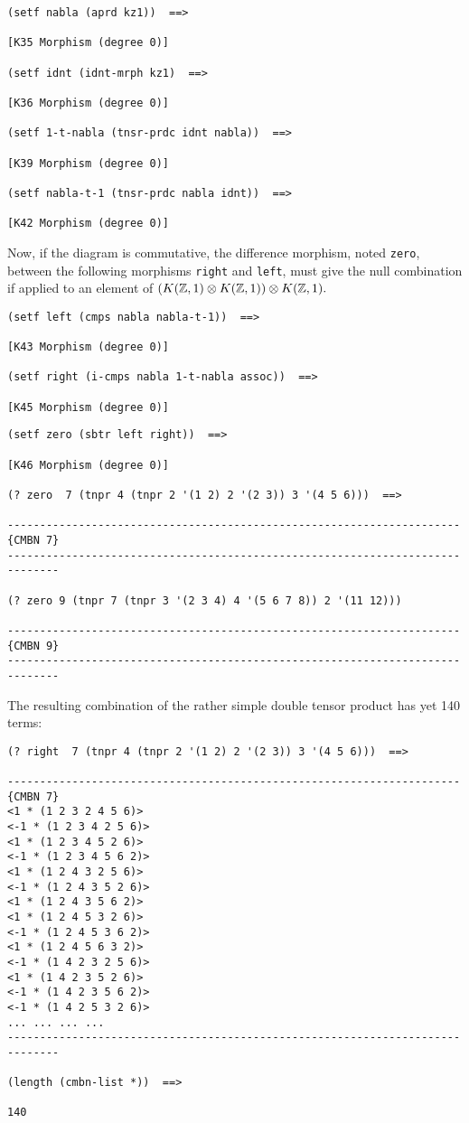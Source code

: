{\footnotesize\begin{verbatim}
(setf nabla (aprd kz1))  ==>

[K35 Morphism (degree 0)]

(setf idnt (idnt-mrph kz1)  ==>

[K36 Morphism (degree 0)]

(setf 1-t-nabla (tnsr-prdc idnt nabla))  ==>

[K39 Morphism (degree 0)]

(setf nabla-t-1 (tnsr-prdc nabla idnt))  ==>

[K42 Morphism (degree 0)]
\end{verbatim}}
Now, if the diagram is commutative, the difference morphism, noted {\tt zero}, between 
the following morphisms {\tt right} and {\tt left}, must give the null combination if applied to an 
element of $(K({{\Bbb Z}}, 1) \otimes K({{\Bbb Z}}, 1)) \otimes K({{\Bbb Z}}, 1).$
{\footnotesize\begin{verbatim}
(setf left (cmps nabla nabla-t-1))  ==>

[K43 Morphism (degree 0)]

(setf right (i-cmps nabla 1-t-nabla assoc))  ==>

[K45 Morphism (degree 0)]
\end{verbatim}}
\newpage
{\footnotesize\begin{verbatim}
(setf zero (sbtr left right))  ==>

[K46 Morphism (degree 0)]

(? zero  7 (tnpr 4 (tnpr 2 '(1 2) 2 '(2 3)) 3 '(4 5 6)))  ==>

----------------------------------------------------------------------{CMBN 7}
------------------------------------------------------------------------------

(? zero 9 (tnpr 7 (tnpr 3 '(2 3 4) 4 '(5 6 7 8)) 2 '(11 12)))

----------------------------------------------------------------------{CMBN 9}
------------------------------------------------------------------------------
\end{verbatim}}
The resulting combination of the rather simple double tensor product has yet
140 terms:
{\footnotesize\begin{verbatim}
(? right  7 (tnpr 4 (tnpr 2 '(1 2) 2 '(2 3)) 3 '(4 5 6)))  ==>

----------------------------------------------------------------------{CMBN 7}
<1 * (1 2 3 2 4 5 6)>
<-1 * (1 2 3 4 2 5 6)>
<1 * (1 2 3 4 5 2 6)>
<-1 * (1 2 3 4 5 6 2)>
<1 * (1 2 4 3 2 5 6)>
<-1 * (1 2 4 3 5 2 6)>
<1 * (1 2 4 3 5 6 2)>
<1 * (1 2 4 5 3 2 6)>
<-1 * (1 2 4 5 3 6 2)>
<1 * (1 2 4 5 6 3 2)>
<-1 * (1 4 2 3 2 5 6)>
<1 * (1 4 2 3 5 2 6)>
<-1 * (1 4 2 3 5 6 2)>
<-1 * (1 4 2 5 3 2 6)>
... ... ... ...
------------------------------------------------------------------------------

(length (cmbn-list *))  ==>

140
\end{verbatim}}
\newpage

